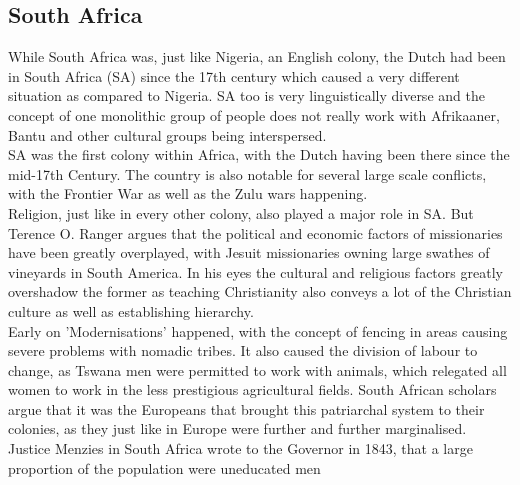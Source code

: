 \documentclass{article}
\begin{document}
	\subsection{South Africa}

	While South Africa was, just like Nigeria, an English colony, the Dutch had been in South Africa (SA) since the 17th century which caused a very different situation as compared to Nigeria. SA too is very linguistically diverse and the concept of one monolithic group of people does not really work with Afrikaaner, Bantu and other cultural groups being interspersed. \\
	SA was the first colony within Africa, with the Dutch having been there since the mid-17th Century. The country is also notable for several large scale conflicts, with the Frontier War as well as the Zulu wars happening. \\
	Religion, just like in every other colony, also played a major role in SA. But Terence O. Ranger argues that the political and economic factors of missionaries have been greatly overplayed, with Jesuit missionaries owning large swathes of vineyards in South America. In his eyes the cultural and religious factors greatly overshadow the former as teaching Christianity also conveys a lot of the Christian culture as well as establishing hierarchy. \\
	Early on 'Modernisations' happened, with the concept of fencing in areas causing severe problems with nomadic tribes. It also caused the division of labour to change, as Tswana men were permitted to work with animals, which relegated all women to work in the less prestigious agricultural fields. South African scholars argue that it was the Europeans that brought this patriarchal system to their colonies, as they just like in Europe were further and further marginalised. Justice Menzies in South Africa wrote to the Governor in 1843, that a large proportion of the population were uneducated men
	
	
	 


	
	
	
























	
\end{document}
